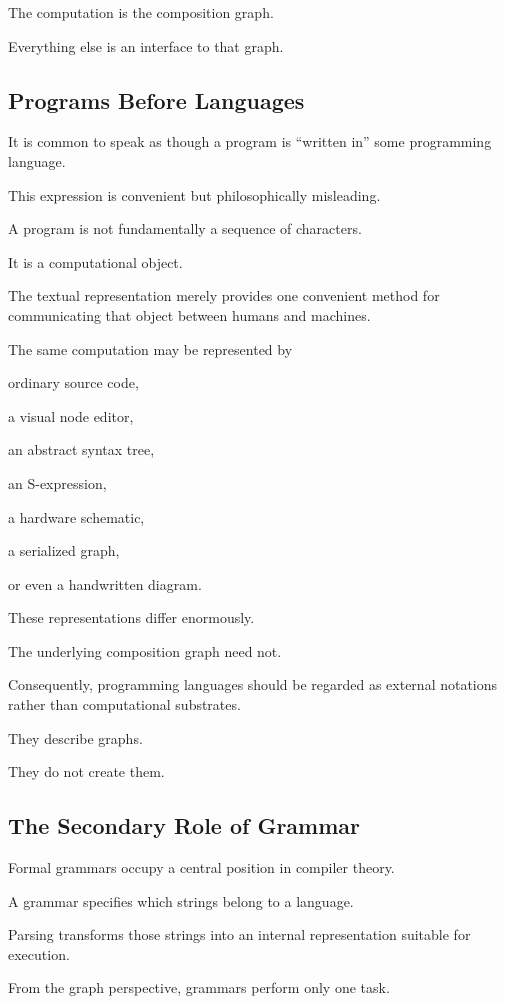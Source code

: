 \documentclass[12pt,oneside]{article}
\begin{document}
The computation is the composition graph.

Everything else is an interface to that graph.

\subsection{Programs Before Languages}

It is common to speak as though a program is ``written in'' some programming language.

This expression is convenient but philosophically misleading.

A program is not fundamentally a sequence of characters.

It is a computational object.

The textual representation merely provides one convenient method for communicating that object between humans and machines.

The same computation may be represented by

ordinary source code,

a visual node editor,

an abstract syntax tree,

an S-expression,

a hardware schematic,

a serialized graph,

or even a handwritten diagram.

These representations differ enormously.

The underlying composition graph need not.

Consequently, programming languages should be regarded as external notations rather than computational substrates.

They describe graphs.

They do not create them.

\subsection{The Secondary Role of Grammar}

Formal grammars occupy a central position in compiler theory.

A grammar specifies which strings belong to a language.

Parsing transforms those strings into an internal representation suitable for execution.

From the graph perspective, grammars perform only one task.
\end{document}
